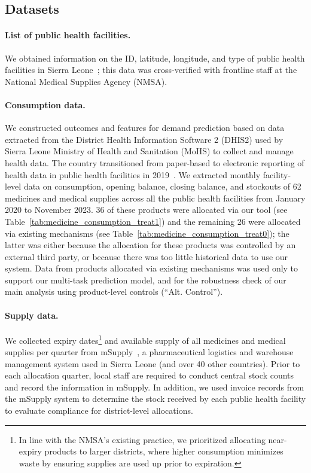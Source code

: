 \documentclass[12pt]{article}
\begin{document}
\subsection{Datasets}
\label{sup:datasets}

\paragraph{List of public health facilities.}

We obtained information on the ID, latitude, longitude, and type of public health facilities in Sierra Leone~\cite{SierraLeoneMoHS_CIESIN_2023}; this data was cross-verified with frontline staff at the National Medical Supplies Agency (NMSA).

\paragraph{Consumption data.} We constructed outcomes and features for demand prediction based on data extracted from the District Health Information Software 2 (DHIS2) used by Sierra Leone Ministry of Health and Sanitation (MoHS) to collect and manage health data. The country transitioned from paper-based to electronic reporting of health data in public health facilities in 2019~\cite{martin2020implementing}. We extracted monthly facility-level data on consumption, opening balance, closing balance, and stockouts of 62 medicines and medical supplies across all the public health facilities from January 2020 to November 2023. 36 of these products were allocated via our tool (see Table~\ref{tab:medicine_consumption_treat1}) and the remaining 26 were allocated via existing mechanisms (see Table~\ref{tab:medicine_consumption_treat0}); the latter was either because the allocation for these products was controlled by an external third party,
or because there was too little historical data to use our system. Data from products allocated via existing mechanisms was used only to support our multi-task prediction model, and for the robustness check of our main analysis using product-level controls (``Alt. Control'').

\paragraph{Supply data.}
We collected expiry dates\footnote{In line with the NMSA's existing practice, we prioritized allocating near-expiry products to larger districts, where higher consumption minimizes waste by ensuring supplies are used up prior to expiration.} and available supply of all medicines and medical supplies per quarter from mSupply~\cite{mSupply}, a pharmaceutical logistics and warehouse management system used in Sierra Leone (and over 40 other countries). Prior to each allocation quarter, local staff are required to conduct central stock counts and record the information in mSupply. In addition, we used invoice records from the mSupply system to determine the stock received by each public health facility to evaluate compliance for district-level allocations.
\end{document}
